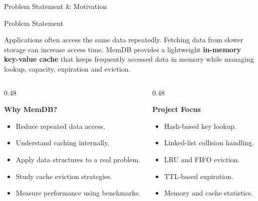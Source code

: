 \documentclass[aspectratio=169,10pt]{beamer}
\begin{document}

\begin{frame}{Problem Statement \& Motivation}

\small

\begin{block}{Problem Statement}

Applications often access the same data repeatedly. Fetching data from
slower storage can increase access time. MemDB provides a lightweight
\textbf{in-memory key-value cache} that keeps frequently accessed data
in memory while managing lookup, capacity, expiration and eviction.

\end{block}

\vspace{2mm}

\begin{columns}[T]

\begin{column}{0.48\textwidth}

\textbf{\color{GEUBlue}Why MemDB?}

\begin{itemize}
    \itemsep2pt
    \item Reduce repeated data access.
    \item Understand caching internally.
    \item Apply data structures to a real problem.
    \item Study cache eviction strategies.
    \item Measure performance using benchmarks.
\end{itemize}

\end{column}

\begin{column}{0.48\textwidth}

\textbf{\color{GEUBlue}Project Focus}

\begin{itemize}
    \itemsep2pt
    \item Hash-based key lookup.
    \item Linked-list collision handling.
    \item LRU and FIFO eviction.
    \item TTL-based expiration.
    \item Memory and cache statistics.
\end{itemize}


\end{column}
\end{columns}
\end{frame}
\end{document}
